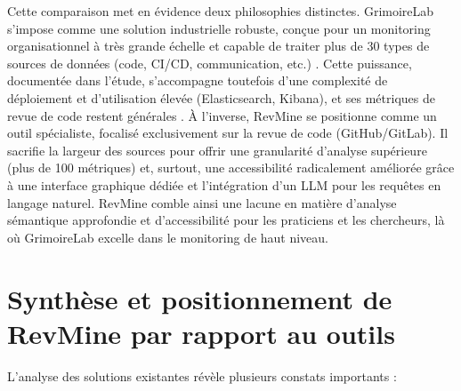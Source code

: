Cette comparaison met en évidence deux philosophies distinctes. GrimoireLab s'impose comme une solution industrielle robuste, conçue pour un monitoring organisationnel à très grande échelle et capable de traiter plus de 30 types de sources de données (code, CI/CD, communication, etc.) \cite{duenas2021grimoirelab}. Cette puissance, documentée dans l'étude, s'accompagne toutefois d'une complexité de déploiement et d'utilisation élevée (Elasticsearch, Kibana), et ses métriques de revue de code restent générales \cite{duenas2021grimoirelab}. À l'inverse, RevMine se positionne comme un outil spécialiste, focalisé exclusivement sur la revue de code (GitHub/GitLab). Il sacrifie la largeur des sources pour offrir une granularité d'analyse supérieure (plus de 100 métriques) et, surtout, une accessibilité radicalement améliorée grâce à une interface graphique dédiée et l'intégration d'un LLM pour les requêtes en langage naturel. RevMine comble ainsi une lacune en matière d'analyse sémantique approfondie et d'accessibilité pour les praticiens et les chercheurs, là où GrimoireLab excelle dans le monitoring de haut niveau.

\section{Synthèse et positionnement de RevMine par rapport au outils}

L'analyse des solutions existantes révèle plusieurs constats importants :


